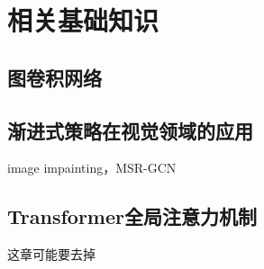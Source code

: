 \chapter{相关基础知识}
\section{图卷积网络}
\section{渐进式策略在视觉领域的应用}
image impainting，MSR-GCN

\section{Transformer全局注意力机制}
这章可能要去掉
